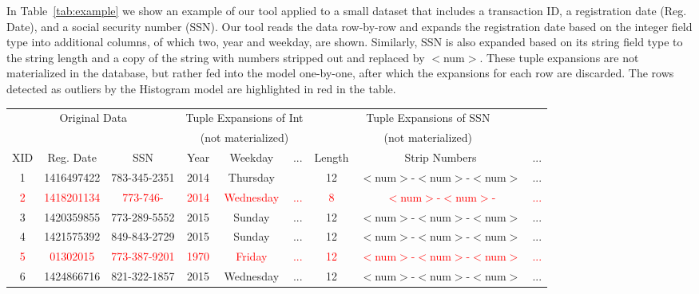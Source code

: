 In Table~\ref{tab:example} we show an example of our tool applied to a small dataset that includes a transaction ID, a registration date (Reg. Date), and a social security number (SSN).
Our tool reads the data row-by-row and expands the registration date based on the integer field type into additional columns, of which two, year and weekday, are shown.
Similarly, SSN is also expanded based on its string field type to the string length and a copy of the string with numbers stripped out and replaced by $<$num$>$.
These tuple expansions are not materialized in the database, but rather fed into the model one-by-one, after which the expansions for each row are discarded.
The rows detected as outliers by the Histogram model are highlighted in red in the table. 

\begin{table*}[t]
\begin{center}
\begin{tabular}{|c|c|c||c|c|c||c|c|c|}
\multicolumn{3}{c}{Original Data} & \multicolumn{3}{c}{Tuple Expansions of Int} & \multicolumn{3}{c}{Tuple Expansions of SSN} \\
\multicolumn{3}{c}{} & \multicolumn{3}{c}{(not materialized)} & \multicolumn{3}{c}{(not materialized)} \\
\hline
XID & Reg. Date & SSN & Year & Weekday & ... & Length & Strip Numbers & ... \\ \hline
1 & 1416497422 & 783-345-2351 & 2014 & Thursday && 12 & $<$num$>$-$<$num$>$-$<$num$>$ &...  \\ \hline 
\textcolor{red}{2} &\textcolor{red}{ 1418201134 }&\textcolor{red}{ 773-746- }&\textcolor{red}{ 2014  }&\textcolor{red}{ Wednesday }&\textcolor{red}{...}&\textcolor{red}{ 8 }&\textcolor{red}{ $<$num$>$-$<$num$>$- }&\textcolor{red}{...}  \\ \hline 
3 & 1420359855 & 773-289-5552 & 2015  & Sunday &...& 12 & $<$num$>$-$<$num$>$-$<$num$>$ &...  \\ \hline 
4 & 1421575392 & 849-843-2729 & 2015 & Sunday &...& 12 & $<$num$>$-$<$num$>$-$<$num$>$ &  ...\\ \hline 
\textcolor{red}{5 }&\textcolor{red}{ 01302015 }&\textcolor{red}{ 773-387-9201 }&\textcolor{red}{ 1970 }&\textcolor{red}{ Friday }&\textcolor{red}{...}&\textcolor{red}{ 12 }&\textcolor{red}{ $<$num$>$-$<$num$>$-$<$num$>$ }&\textcolor{red}{  ...}\\ \hline 
6 & 1424866716 & 821-322-1857 & 2015 & Wednesday &...& 12 & $<$num$>$-$<$num$>$-$<$num$>$ &  ...\\ \hline 

\end{tabular}
\end{center}
\end{table*}
